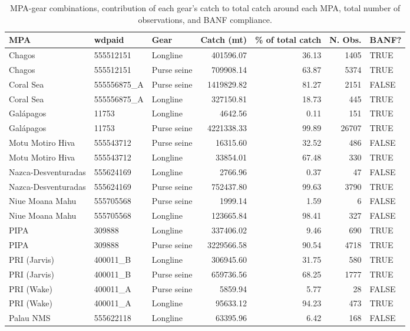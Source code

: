 \begin{table}

\caption{\label{tab:relevant_mpa_gear_combinations}MPA-gear combinations, contribution of each gear's catch to total catch around each MPA, total number of observations, and BANF compliance.}
\centering
\begin{tabular}[t]{lllrrrl}
\toprule
MPA & wdpaid & Gear & Catch (mt) & \% of total catch & N. Obs. & BANF?\\
\midrule
Chagos & 555512151 & Longline & 401596.07 & 36.13 & 1405 & TRUE\\
Chagos & 555512151 & Purse seine & 709908.14 & 63.87 & 5374 & TRUE\\
Coral Sea & 555556875\_A & Purse seine & 1419829.82 & 81.27 & 2151 & FALSE\\
Coral Sea & 555556875\_A & Longline & 327150.81 & 18.73 & 445 & TRUE\\
Galápagos & 11753 & Longline & 4642.56 & 0.11 & 151 & TRUE\\
\addlinespace
Galápagos & 11753 & Purse seine & 4221338.33 & 99.89 & 26707 & TRUE\\
Motu Motiro Hiva & 555543712 & Purse seine & 16315.60 & 32.52 & 486 & FALSE\\
Motu Motiro Hiva & 555543712 & Longline & 33854.01 & 67.48 & 330 & TRUE\\
Nazca-Desventuradas & 555624169 & Longline & 2766.96 & 0.37 & 47 & FALSE\\
Nazca-Desventuradas & 555624169 & Purse seine & 752437.80 & 99.63 & 3790 & TRUE\\
\addlinespace
Niue Moana Mahu & 555705568 & Purse seine & 1999.14 & 1.59 & 6 & FALSE\\
Niue Moana Mahu & 555705568 & Longline & 123665.84 & 98.41 & 327 & FALSE\\
PIPA & 309888 & Longline & 337406.02 & 9.46 & 690 & TRUE\\
PIPA & 309888 & Purse seine & 3229566.58 & 90.54 & 4718 & TRUE\\
PRI (Jarvis) & 400011\_B & Longline & 306945.60 & 31.75 & 580 & TRUE\\
\addlinespace
PRI (Jarvis) & 400011\_B & Purse seine & 659736.56 & 68.25 & 1777 & TRUE\\
PRI (Wake) & 400011\_A & Purse seine & 5859.94 & 5.77 & 28 & FALSE\\
PRI (Wake) & 400011\_A & Longline & 95633.12 & 94.23 & 473 & TRUE\\
Palau NMS & 555622118 & Longline & 63395.96 & 6.42 & 168 & FALSE\\

\end{tabular}
\end{table}
